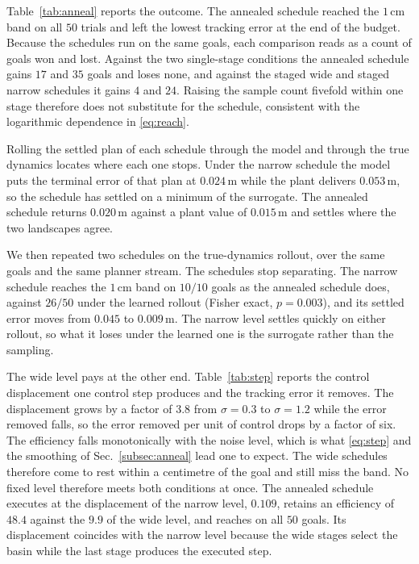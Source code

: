 \documentclass[letterpaper,10pt,conference]{ieeeconf}
\begin{document}
Table~\ref{tab:anneal} reports the outcome.
The annealed schedule reached the $1$\,cm band on all $50$ trials and left the lowest tracking error at the end of the budget.
Because the schedules run on the same goals, each comparison reads as a count of goals won and lost.
Against the two single-stage conditions the annealed schedule gains $17$ and $35$ goals and loses none, and against the staged wide and staged narrow schedules it gains $4$ and $24$.
Raising the sample count fivefold within one stage therefore does not substitute for the schedule, consistent with the logarithmic dependence in \eqref{eq:reach}.

Rolling the settled plan of each schedule through the model and through the true dynamics locates where each one stops.
Under the narrow schedule the model puts the terminal error of that plan at $0.024$\,m while the plant delivers $0.053$\,m, so the schedule has settled on a minimum of the surrogate.
The annealed schedule returns $0.020$\,m against a plant value of $0.015$\,m and settles where the two landscapes agree.

We then repeated two schedules on the true-dynamics rollout, over the same goals and the same planner stream.
The schedules stop separating.
The narrow schedule reaches the $1$\,cm band on $10/10$ goals as the annealed schedule does, against $26/50$ under the learned rollout (Fisher exact, $p = 0.003$), and its settled error moves from $0.045$ to $0.009$\,m.
The narrow level settles quickly on either rollout, so what it loses under the learned one is the surrogate rather than the sampling.

The wide level pays at the other end.
Table~\ref{tab:step} reports the control displacement one control step produces and the tracking error it removes.
The displacement grows by a factor of $3.8$ from $\sigma = 0.3$ to $\sigma = 1.2$ while the error removed falls, so the error removed per unit of control drops by a factor of six.
The efficiency falls monotonically with the noise level, which is what \eqref{eq:step} and the smoothing of Sec.~\ref{subsec:anneal} lead one to expect.
The wide schedules therefore come to rest within a centimetre of the goal and still miss the band.
No fixed level therefore meets both conditions at once.
The annealed schedule executes at the displacement of the narrow level, $0.109$, retains an efficiency of $48.4$ against the $9.9$ of the wide level, and reaches on all $50$ goals.
Its displacement coincides with the narrow level because the wide stages select the basin while the last stage produces the executed step.
\end{document}
